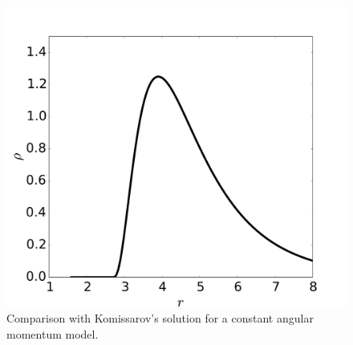 \documentclass{aa}
\begin{document}
\begin{figure}
\includegraphics[scale=0.16]{figures/fig1c.pdf}
\caption{Comparison with Komissarov's solution for a constant angular momentum model.}
           \label{komissarov}%
 \end{figure}


\end{document}
